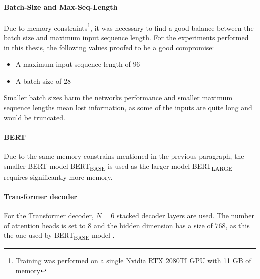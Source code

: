 \paragraph{Batch-Size and Max-Seq-Length}

Due to memory constraints\footnote{Training was performed on a single Nvidia RTX 2080TI GPU with 11 GB of memory}, it was necessary to find a good balance between the batch size and maximum input sequence length.
For the experiments performed in this thesis, the following values proofed to be a good compromise:
\begin{itemize}
\item A maximum input sequence length of $96$ %
\item A batch size of $28$
\end{itemize}

Smaller batch sizes harm the networks performance and smaller maximum sequence lengths mean lost information, as some of the inputs are quite long and would be truncated.

\paragraph{BERT}

Due to the same memory constrains mentioned in the previous paragraph, the smaller BERT model BERT\textsubscript{BASE} is used as the larger model BERT\textsubscript{LARGE} requires significantly more memory.

\paragraph{Transformer decoder}

For the Transformer decoder, $N=6$ stacked decoder layers are used.
The number of attention heads is set to $8$ and the hidden dimension has a size of $768$, as this the one used by BERT\textsubscript{BASE} model \cite[p.~3]{devlin2018bert}.
